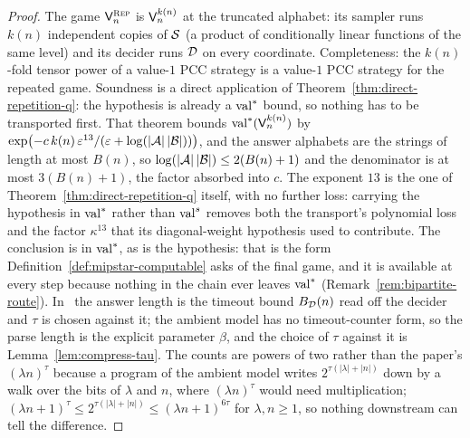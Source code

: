 \begin{proof}
\leanok
{}
The game $\mathsf{V}^{\textsc{Rep}}_n$ is $\mathsf{V}_n^{k(n)}$ at the truncated alphabet: its sampler runs
$k(n)$ independent copies of $\mathcal{S}$ (a product of conditionally linear functions of the
same level) and its decider runs $\mathcal{D}$ on every coordinate. Completeness: the
$k(n)$-fold tensor power of a value-$1$ PCC strategy is a value-$1$ PCC strategy for the
repeated game. Soundness is a direct application of
Theorem~\ref{thm:direct-repetition-q}: the hypothesis is already a $\mathrm{val}^*$ bound, so
nothing has to be transported first. That theorem bounds $\mathrm{val}^*(\mathsf{V}_n^{k(n)})$ by
$\exp\bigl( -c\, k(n)\, \varepsilon^{13} / (\varepsilon + \log(\left\vert {\ensuremath{\mathcal{A}}} \right\vert\left\vert {\ensuremath{\mathcal{B}}} \right\vert)) \bigr)$, and the answer
alphabets are the strings of length at most $B(n)$, so $\log(\left\vert {\ensuremath{\mathcal{A}}} \right\vert\left\vert {\ensuremath{\mathcal{B}}} \right\vert) \leq 2(B(n)
+ 1)$ and the denominator is at most $3(B(n) + 1)$, the factor absorbed into $c$. The
exponent $13$ is the one of Theorem~\ref{thm:direct-repetition-q} itself, with no further
loss: carrying the hypothesis in $\mathrm{val}^*$ rather than $\mathrm{val}^{s}$ removes both the
transport's polynomial loss and the factor $\kappa^{13}$ that its diagonal-weight hypothesis
used to contribute. The conclusion is in $\mathrm{val}^*$, as is the hypothesis: that is the form
Definition~\ref{def:mipstar-computable} asks of the final game, and it is available at every step
because nothing in the chain ever leaves $\mathrm{val}^*$ (Remark~\ref{rem:bipartite-route}).
In~\cite{JNVWY20} the answer length is the timeout bound $B_{\mathcal{D}}(n)$ read off the
decider and $\tau$ is chosen against it; the ambient model has no timeout-counter form, so
the parse length is the explicit parameter $\beta$, and the choice of $\tau$ against it is
Lemma~\ref{lem:compress-tau}. The counts are powers of two rather than the paper's
$(\lambda n)^\tau$ because a program of the ambient model writes $2^{\tau(|\lambda| + |n|)}$
down by a walk over the bits of $\lambda$ and $n$, where $(\lambda n)^\tau$ would need
multiplication; $(\lambda n + 1)^\tau \leq 2^{\tau(|\lambda| + |n|)} \leq (\lambda n +
1)^{6\tau}$ for $\lambda, n \geq 1$, so nothing downstream can tell the difference.

\end{proof}

